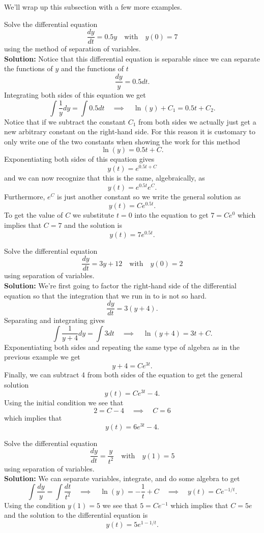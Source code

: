 We'll wrap up this subsection with a few more examples.
\begin{example}
    Solve the differential equation 
    \[ \frac{dy}{dt} = 0.5 y \quad \text{with} \quad y(0) = 7 \]
    using the method of separation of variables.\\{\bf Solution:} Notice that this
    differential equation is separable since we can separate the functions of $y$ and the
    functions of $t$
    \[ \frac{dy}{y} = 0.5 dt. \]
    Integrating both sides of this equation we get
    \[ \int \frac{1}{y} dy = \int 0.5 dt \quad \implies \quad \ln(y) + C_1 = 0.5 t + C_2.
    \]
    Notice that if we subtract the constant $C_1$ from both sides we actually just get
    a new arbitrary constant on the right-hand side.  For this reason it is customary to
    only write one of the two constants when showing the work for this method
    \[ \ln(y) = 0.5 t + C. \]
    Exponentiating both sides of this equation gives 
    \[ y(t) = e^{0.5 t + C} \]
    and we can now recognize that this is the same, algebraically, as
    \[ y(t) = e^{0.5t} e^C.  \]
    Furthermore, $e^C$ is just another constant so we write the general solution as 
    \[ y(t) = Ce^{0.5t}. \]
    To get the value of $C$ we substitute $t=0$ into the equation to get $7 = Ce^0$ which
    implies that $C= 7$ and the solution is 
    \[ y(t) = 7e^{0.5t}. \]
\end{example}

\begin{example}
    Solve the differential equation 
    \[ \frac{dy}{dt} = 3y+12 \quad \text{with} \quad y(0) = 2 \]
    using separation of variables. \\{\bf Solution:} We're first going to factor the
    right-hand side of the differential equation so that the integration that we run in to
    is not so hard.
    \[ \frac{dy}{dt} = 3(y+4). \]
    Separating and integrating gives
    \[ \int \frac{1}{y+4} dy = \int 3dt \quad \implies \quad \ln(y+4) = 3t+C. \]
    Exponentiating both sides and repeating the same type of algebra as in the previous
    example we get
    \[ y + 4 = Ce^{3t}. \]
    Finally, we can subtract 4 from both sides of the equation to get the general solution
    \[ y(t) = Ce^{3t} - 4. \]
    Using the initial condition we see that 
    \[ 2 = C - 4 \quad \implies \quad C=6 \]
    which implies that 
    \[ y(t) = 6 e^{3t} - 4. \]
\end{example}

\begin{example}
    Solve the differential equation
    \[ \frac{dy}{dt} = \frac{y}{t^2} \quad \text{with} \quad y(1) = 5 \]
    using separation of variables.  \\{\bf Solution:} We can separate variables,
    integrate, and do some algebra to get
    \[ \int \frac{dy}{y} = \int \frac{dt}{t^2} \quad \implies \quad \ln(y) =
    -\frac{1}{t} + C \quad \implies \quad y(t) = Ce^{-1/t}. \]
    Using the condition $y(1) = 5$ we see that $5 = Ce^{-1}$ which implies that $C = 5e$
    and the solution to the differential equation is 
    \[ y(t) = 5e^{1-1/t}. \]
\end{example}

